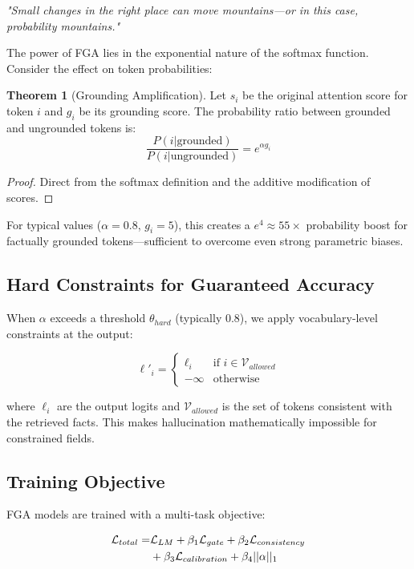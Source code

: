 \documentclass[11pt, a4paper]{article}
\theoremstyle{definition}
\newtheorem{theorem}{Theorem}
\begin{document}
\textit{"Small changes in the right place can move mountains—or in this case, probability mountains."}

The power of FGA lies in the exponential nature of the softmax function. Consider the effect on token probabilities:

\begin{theorem}[Grounding Amplification]
Let $s_i$ be the original attention score for token $i$ and $g_i$ be its grounding score. The probability ratio between grounded and ungrounded tokens is:
$$\frac{P(i|\text{grounded})}{P(i|\text{ungrounded})} = e^{\alpha g_i}$$
\end{theorem}

\begin{proof}
Direct from the softmax definition and the additive modification of scores.
\end{proof}

For typical values ($\alpha = 0.8$, $g_i = 5$), this creates a $e^4 \approx 55\times$ probability boost for factually grounded tokens—sufficient to overcome even strong parametric biases.

\subsection{Hard Constraints for Guaranteed Accuracy}

When $\alpha$ exceeds a threshold $\theta_{hard}$ (typically 0.8), we apply vocabulary-level constraints at the output:

\begin{equation}
\ell'_i = \begin{cases}
\ell_i & \text{if } i \in \mathcal{V}_{allowed} \\
-\infty & \text{otherwise}
\end{cases}
\end{equation}

where $\ell_i$ are the output logits and $\mathcal{V}_{allowed}$ is the set of tokens consistent with the retrieved facts. This makes hallucination mathematically impossible for constrained fields.

\subsection{Training Objective}

FGA models are trained with a multi-task objective:

\begin{align}
\mathcal{L}_{total} = &\mathcal{L}_{LM} + \beta_1 \mathcal{L}_{gate} + \beta_2 \mathcal{L}_{consistency} \notag \\
&+ \beta_3 \mathcal{L}_{calibration} + \beta_4 ||\alpha||_1
\end{align}
\end{document}
